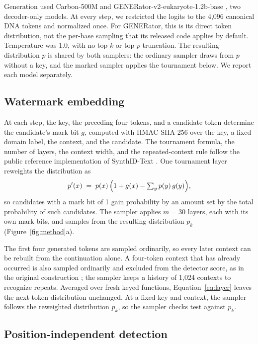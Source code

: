 \documentclass[10pt,twocolumn]{article}
\begin{document}
Generation used Carbon-500M \cite{carbon2026,carbon500m} and GENERator-v2-eukaryote-1.2b-base
\cite{generatorv22026,generatorv2checkpoint}, two decoder-only models. At every step, we restricted the logits to the 4{,}096 canonical
DNA tokens and normalized once. For GENERator, this is its direct token distribution, not the
per-base sampling that its released code applies by default. Temperature was 1.0, with no top-$k$
or top-$p$ truncation. The resulting distribution $p$ is shared by both samplers: the ordinary
sampler draws from $p$ without a key, and the marked sampler applies the tournament below. We
report each model separately.

\subsection{Watermark embedding}

At each step, the key, the preceding four tokens, and a candidate token determine the candidate's
mark bit $g$, computed with HMAC-SHA-256 over the key, a fixed domain label, the context, and the
candidate. The tournament formula, the number of layers, the context width, and the
repeated-context rule follow the public reference implementation of SynthID-Text
\cite{synthidtextcode}. One tournament layer reweights the distribution as
\begin{equation}
p'(x) \;=\; p(x)\,\Bigl(1 + g(x) - \textstyle\sum_y p(y)\, g(y)\Bigr),
\label{eq:layer}
\end{equation}
so candidates with a mark bit of 1 gain probability by an amount set by the total probability of
such candidates. The sampler applies $m = 30$ layers, each with its own mark bits, and samples from
the resulting distribution $p_k$ (Figure~\ref{fig:method}a).

The first four generated tokens are sampled ordinarily, so every later context can be rebuilt from
the continuation alone. A four-token context that has already occurred is also sampled ordinarily
and excluded from the detector score, as in the original construction
\cite{dathathri2024scalable}; the sampler keeps a history of 1{,}024 contexts to recognize
repeats. Averaged over fresh keyed functions, Equation~\ref{eq:layer} leaves the next-token
distribution unchanged. At a fixed key and context, the sampler follows the reweighted
distribution $p_k$, so the sampler checks test against $p_k$.

\subsection{Position-independent detection}
\label{sec:detection}
\end{document}
